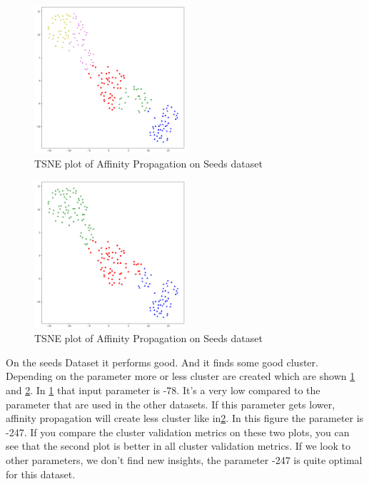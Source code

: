 \begin{figure}[!ht]
	\caption{TSNE plot of Affinity Propagation on Seeds dataset}
	\begin{center}
		\includegraphics[width=0.5\textwidth]{images/af_seed78.png}
	\end{center}
	\label{fig:af_seeds78}
\end{figure}

\begin{figure}[!ht]
	\caption{TSNE plot of Affinity Propagation on Seeds dataset}
	\begin{center}
		\includegraphics[width=0.5\textwidth]{images/af_seeds247.png}
	\end{center}
	\label{fig:af_seeds2}
\end{figure}

On the seeds Dataset it performs good. And it finds some good cluster. Depending on the parameter more or less cluster are created which are shown \ref{fig:af_seeds78} and \ref{fig:af_seeds2}. In \ref{fig:af_seeds78} that input parameter is -78. It’s a very low compared to the parameter that are used in the other datasets. If this parameter gets lower, affinity propagation will create less cluster like in\ref{fig:af_seeds2}. In this figure the parameter is -247. If you compare the cluster validation metrics on these two plots, you can see that the second plot is better in all cluster validation metrics. If we look to other parameters, we don’t find new insights, the parameter -247 is quite optimal for this dataset. 

